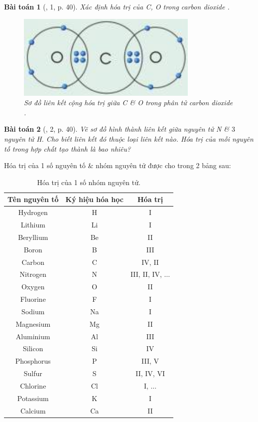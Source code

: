 \documentclass{article}
\newtheorem{baitoan}{Bài toán}
\begin{document}
\begin{baitoan}[\cite{SGK_KHTN_7_Canh_Dieu}, 1, p. 40]
	 Xác định hóa trị của \emph{C, O} trong carbon dioxide \emph{}.
	 \begin{figure}[H]
	 	\centering
	 	\includegraphics[scale=0.3]{CO2}
	 	\caption{Sơ đồ liên kết cộng hóa trị giữa C \& O trong phân tử carbon dioxide .}
	 \end{figure}
\end{baitoan}

\begin{baitoan}[\cite{SGK_KHTN_7_Canh_Dieu}, 2, p. 40]
	Vẽ sơ đồ hình thành liên kết giữa nguyên tử \emph{N} \& $3$ nguyên tử \emph{H}. Cho biết liên kết đó thuộc loại liên kết nào. Hóa trị của mỗi nguyên tố trong hợp chất tạo thành là bao nhiêu?
\end{baitoan}
Hóa trị của 1 số nguyên tố \& nhóm nguyên tử được cho trong 2 bảng sau:
\begin{table}[H]
	\centering
	\begin{tabular}{|c|c|c|}
		\hline
		Tên nguyên tố & Ký hiệu hóa học & Hóa trị \\
		\hline
		Hydrogen & H & I \\
		\hline
		Lithium & Li & I \\
		\hline
		Beryllium & Be & II \\
		\hline
		Boron & B & III \\
		\hline
		Carbon & C & IV, II \\
		\hline
		Nitrogen & N & III, II, IV, $\ldots$ \\
		\hline
		Oxygen & O & II \\
		\hline
		Fluorine & F & I \\
		\hline
		Sodium & Na & I \\
		\hline
		Magnesium & Mg & II \\
		\hline
		Aluminium & Al & III \\
		\hline
		Silicon & Si & IV \\
		\hline
		Phosphorus & P & III, V \\
		\hline
		Sulfur & S & II, IV, VI \\
		\hline
		Chlorine & Cl & I, $\ldots$ \\
		\hline
		Potassium & K & I \\
		\hline
		Calcium & Ca & II \\
		\hline
	\end{tabular}
	\caption{Hóa trị của 1 số nhóm nguyên tử.}
	\label{tab: hoa tri nguyen tu}
\end{table}
\end{document}
